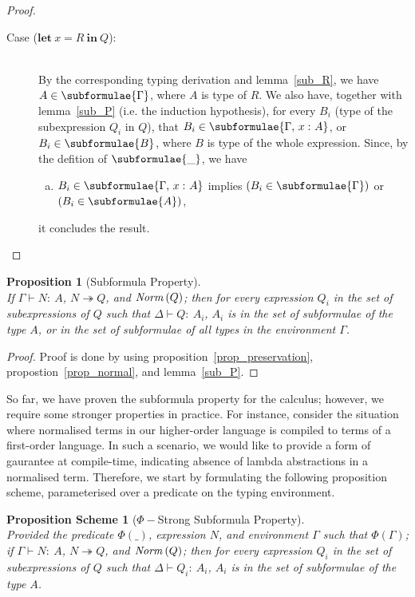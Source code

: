 \documentclass[a4paper]{article}
\newcommand{\typecolor}{}
\newcommand{\termcolor}{}
\newcommand{\tp}[1]{{\typecolor #1}}
\newcommand{\tm}[1]{{\termcolor #1}}
\newtheorem{proposition}[theorem]{Proposition}
\newtheorem{scheme}[theorem]{Proposition Scheme}
\newcommand{\expshr}[3]{\mathbf{let}\ #1\boldsymbol{=}#2\ \mathbf{in}\ #3}
\newcommand{\typing}[2]{\tm{#1:\ }\tp{#2}}
\newcommand{\typenvcon}[2]{\tp{\Gamma,}\ \typing{#1}{#2}}
\newcommand{\txt}[1]{\text{\textit{#1}}}
\newcommand{\reducestar}[3]{#1 \overset{#2}\twoheadrightarrow #3}
\newcommand{\norm}[1]{\txt{Norm}\,(#1)}
\begin{document}
\begin{proof}
\begin{description}
\item[Case ($\expshr{x}{R}{Q}$):]\ \\
  By the corresponding typing derivation and lemma~\ref{sub_R}, we
  have $A \in \subformulae{\Gamma}$, where $A$ is type of $R$. We also
  have, together with lemma~\ref{sub_P} (i.e. the induction
  hypothesis), for every $B_i$ (type of the subexpression $Q_i$ in
  $Q$), that $B_i \in \subformulae{\typenvcon{x}{A}}$, or $B_i \in
  \subformulae{B}$, where $B$ is type of the whole expression. Since, by the defition of $\subformulae{\_}$, we have
  \begin{enumerate}[(a)] 
     \item $B_i \in \subformulae{\typenvcon{x}{A}}$ implies $(B_i \in \subformulae{\Gamma})$ or $(B_i \in \subformulae{A})$,
  \end{enumerate}
  it concludes the result.
\end{description}
\end{proof}

\begin{proposition}[Subformula Property]\ \\
\label{prop_subformula}
If $\Gamma \vdash \typing{N}{A}$, $\reducestar{N}{}{Q}$, and $\norm{Q}$;
then for every expression $Q_i$ in the set of subexpressions of $Q$ such
that $\Delta \vdash \typing{Q}{A_i}$, $A_i$ is in the set of subformulae of
the type $A$, or in the set of subformulae of all types in the
environment $\Gamma$.
\end{proposition}
\begin{proof}
Proof is done by using proposition~\ref{prop_preservation},
propostion~\ref{prop_normal}, and lemma~\ref{sub_P}.
\end{proof}

So far, we have proven the subformula property for the calculus;
however, we require some stronger properties in practice. For
instance, consider the situation where normalised terms in our
higher-order language is compiled to terms of a first-order
language. In such a scenario, we would like to provide a form of
gaurantee at compile-time, indicating absence of lambda abstractions
in a normalised term. Therefore, we start by formulating the following
proposition scheme, parameterised over a predicate on the typing
environment.

\begin{scheme}[$\Phi-$Strong Subformula Property]\ \\
\label{sub_scheme}
Provided the predicate $\Phi(\_)$, expression $N$, and environment
$\Gamma$ such that $\Phi(\Gamma)$; if $\Gamma \vdash \typing{N}{A}$,
$\reducestar{N}{}{Q}$, and $\norm{Q}$; then for every expression $Q_i$
in the set of subexpressions of $Q$ such that $\Delta \vdash
\typing{Q_i}{A_i}$, $A_i$ is in the set of subformulae of the type
$A$.
\end{scheme}
\end{document}
